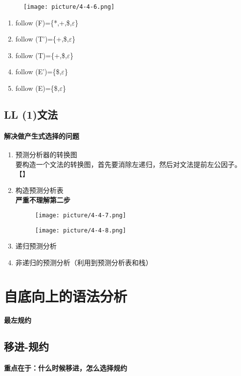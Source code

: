 \documentclass[UTF8]{article}
\begin{document}
 \begin{figure}[]
   \centering
   \texttt{[image: picture/4-4-6.png]}
 \end{figure}
 
 \begin{enumerate}
   \item follow (F)=\{*,+,\$,$\varepsilon$\}
   \item follow (T')=\{+,\$,$\varepsilon$\}
   \item follow (T)=\{+,\$,$\varepsilon$\}
   \item follow (E')=\{\$,$\varepsilon$\}
   \item follow (E)=\{\$,$\varepsilon$\}
 \end{enumerate}
 \subsection{LL (1)文法}%
 \label{sub:ll_1_文法}
 \paragraph{解决做产生式选择的问题}%
 \label{par:解决做产生式选择的问题}
 \begin{enumerate}
   \item 预测分析器的转换图\\
   要构造一个文法的转换图，首先要消除左递归，然后对文法提前左公因子。
   【】
   \item 构造预测分析表\\
   \textbf{严重不理解第二步}\\
   \begin{figure}[]
     \centering
     \texttt{[image: picture/4-4-7.png]}
   \end{figure}

   \begin{figure}[]
     \centering
     \texttt{[image: picture/4-4-8.png]}
   \end{figure}

   \item 递归预测分析
   \item 非递归的预测分析（利用到预测分析表和栈）
 \end{enumerate}

 \section{自底向上的语法分析}%
 \label{sec:自底向上的语法分析}
 \paragraph{最左规约}%
 \label{par:最左规约}
 \subsection{移进-规约}%
 \label{sub:移进_规约}
 \paragraph{重点在于：什么时候移进，怎么选择规约}%
 \label{par:重点在于_什么时候移进_怎么选择规约}
 
 
 
 
 
 
 
 
  
\end{document}
